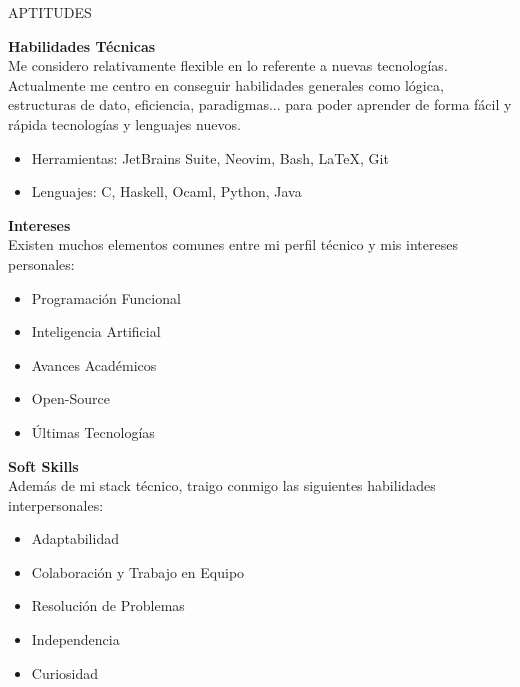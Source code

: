 \documentclass [10pt, a4paper] {extarticle}
\newcommand{\sectionlinethickness} {1.3 pt }
\newcommand{\leftcolumwidth} {0.18 }
\newcommand{\rightcolumwidth}{ 0.82 }
\newcommand {\sectiontitle}[1] {
    \begin {flushleft}
    \begin {minipage}[c]{\leftcolumwidth\textwidth}
        \begin {flushright}
        \!\MakeUppercase {#1}
        \hspace* {10px}
        \end {flushright}
    \end {minipage}
        \begin {tikzpicture}
            \hspace{-4px}
            \draw [line width=\sectionlinethickness, namelines] (1,0) -- (15.363,0);
        \end {tikzpicture}
    \end {flushleft}
}
\begin{document}

    \sectiontitle {aptitudes}

    \begin {flushright}
    \begin {minipage} [t] {\rightcolumwidth\textwidth}

        \textbf {Habilidades Técnicas} \\ [4px]
        Me considero relativamente flexible en lo referente a nuevas tecnologías. Actualmente me centro en conseguir habilidades generales como lógica, estructuras de dato, eficiencia, paradigmas... para poder aprender de forma fácil y rápida tecnologías y lenguajes nuevos.
        \vspace {-2px}
        \begin {itemize} [noitemsep]
            \item Herramientas: JetBrains Suite, Neovim, Bash, LaTeX, Git
            \item Lenguajes: C, Haskell, Ocaml, Python, Java
        \end {itemize}

        \begin {minipage} [t] {0.475\textwidth}
            \textbf {Intereses} \\ [4px]
            Existen muchos elementos comunes entre mi perfil técnico y mis intereses personales:
            \vspace {-3px}
            \begin {itemize} [noitemsep]
                \item Programación Funcional
                \item Inteligencia Artificial
                \item Avances Académicos
                \item Open-Source
                \item Últimas Tecnologías
            \end {itemize}
        \end {minipage}
        \hfill
        \begin {minipage} [t] {0.475\textwidth}
            \textbf {Soft Skills} \\ [4px]
            Además de mi stack técnico, traigo conmigo las siguientes habilidades interpersonales:
            \vspace {-3px}
            \begin {itemize} [noitemsep]
                \item Adaptabilidad
                \item Colaboración y Trabajo en Equipo
                \item Resolución de Problemas
                \item Independencia
                \item Curiosidad
            \end {itemize}
        \end {minipage}
    \end {minipage}
    \end {flushright}
\end{document}
